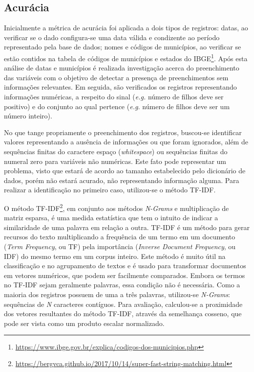\documentclass[
  12,
  table]{proadi}
\begin{document}
\hypertarget{acuruxe1cia}{%
\subsection{Acurácia}\label{acuruxe1cia}}

Inicialmente a métrica de acurácia foi aplicada a dois tipos de
registros: datas, ao verificar se o dado configura-se uma data válida e
condizente ao período representado pela base de dados; nomes e códigos
de municípios, ao verificar se estão contidos na tabela de códigos de
municípios e estados do IBGE\footnote{\url{https://www.ibge.gov.br/explica/codigos-dos-municipios.php}}.
Após esta análise de datas e municípios é realizada investigação acerca
do preenchimento das variáveis com o objetivo de detectar a presença de
preenchimentos sem informações relevantes. Em seguida, são verificados
os registros representando informações numéricas, a respeito do sinal
(\emph{e.g.} número de filhos deve ser positivo) e do conjunto ao qual
pertence (\emph{e.g.} número de filhos deve ser um número inteiro).

No que tange propriamente o preenchimento dos registros, buscou-se
identificar valores representando a ausência de informações ou que foram
ignorados, além de sequências finitas do caractere espaço
(\emph{whitespace}) ou sequências finitas do numeral zero para variáveis
não numéricas. Este fato pode representar um problema, visto que estará
de acordo ao tamanho estabelecido pelo dicionário de dados, porém não
estará acurado, não representando informação alguma. Para realizar a
identificação no primeiro caso, utilizou-se o método TF-IDF.

O método TF-IDF\footnote{\url{https://bergvca.github.io/2017/10/14/super-fast-string-matching.html}},
em conjunto aos métodos \emph{N-Grams} e multiplicação de matriz
esparsa, é uma medida estatística que tem o intuito de indicar a
similaridade de uma palavra em relação a outra. TF-IDF é um método para
gerar recursos do texto multiplicando a frequência de um termo em um
documento (\emph{Term Frequency}, ou TF) pela importância (\emph{Inverse
Document Frequency}, ou IDF) do mesmo termo em um corpus inteiro. Este
método é muito útil na classificação e no agrupamento de textos e é
usado para transformar documentos em vetores numéricos, que podem ser
facilmente comparados. Embora os termos no TF-IDF sejam geralmente
palavras, essa condição não é necessária. Como a maioria dos registros
possuem de uma a três palavras, utilizou-se \emph{N-Grams}: sequências
de \emph{N} caracteres contíguos. Para avaliação, calculou-se a
proximidade dos vetores resultantes do método TF-IDF, através da
semelhança cosseno, que pode ser vista como um produto escalar
normalizado.
\end{document}
